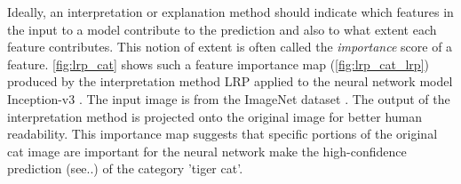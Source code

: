 Ideally, an interpretation or explanation method should indicate which features in the input to a model contribute to the prediction and also to what extent each feature contributes. This notion of extent is often called the \textit{importance} score of a feature. \autoref{fig:lrp_cat} shows such a feature importance map (\autoref{fig:lrp_cat_lrp}) produced by the interpretation method LRP \cite{bach2015pixel} applied to the neural network model Inception-v3 \cite{szegedy2016rethinking}. The input image is from the ImageNet dataset \cite{ILSVRC15}. The output of the interpretation method is projected onto the original image for better human readability. This importance map suggests that specific portions of the original cat image are important for the neural network make the high-confidence prediction (see..) of the category 'tiger cat'. 

